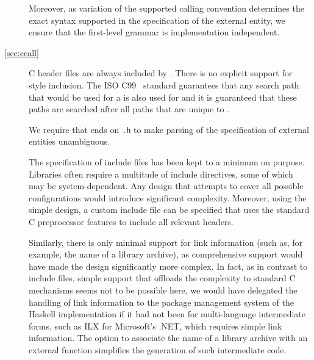 \documentclass[a4paper,twosides]{article}
\newcommand{\code}[1]{\texttt{#1}}      %
\begin{document}
\begin{description}
  Moreover, as variation of the supported calling convention determines the
  exact syntax supported in the specification of the external entity, we
  ensure that the first-level grammar is implementation independent.
\item[\ref{sec:ccall}] C header files are always included by .  There is no explicit support for  style inclusion.  The ISO C99~\cite{C99} standard
  guarantees that any search path that would be used for a  is also used for  and
  it is guaranteed that these paths are searched after all paths that are
  unique to .
  
  We require that  ends on \code{.h} to make parsing of the
  specification of external entities unambiguous.
  
  The specification of include files has been kept to a minimum on purpose.
  Libraries often require a multitude of include directives, some of which may
  be system-dependent.  Any design that attempts to cover all possible
  configurations would introduce significant complexity.  Moreover, using the
  simple design, a custom include file can be specified that uses the standard
  C preprocessor features to include all relevant headers.
  
  Similarly, there is only minimal support for link information (such as, for
  example, the name of a library archive), as comprehensive support would have
  made the design significantly more complex.  In fact, as in contrast to
  include files, simple support that offloads the complexity to standard C
  mechanisms seems not to be possible here, we would have delegated the
  handling of link information to the package management system of the Haskell
  implementation if it had not been for multi-language intermediate forms,
  such as ILX for Microsoft's .NET, which requires simple link information.
  The option to associate the name of a library archive with an external
  function simplifies the generation of such intermediate code.
\end{description}




\end{document}
